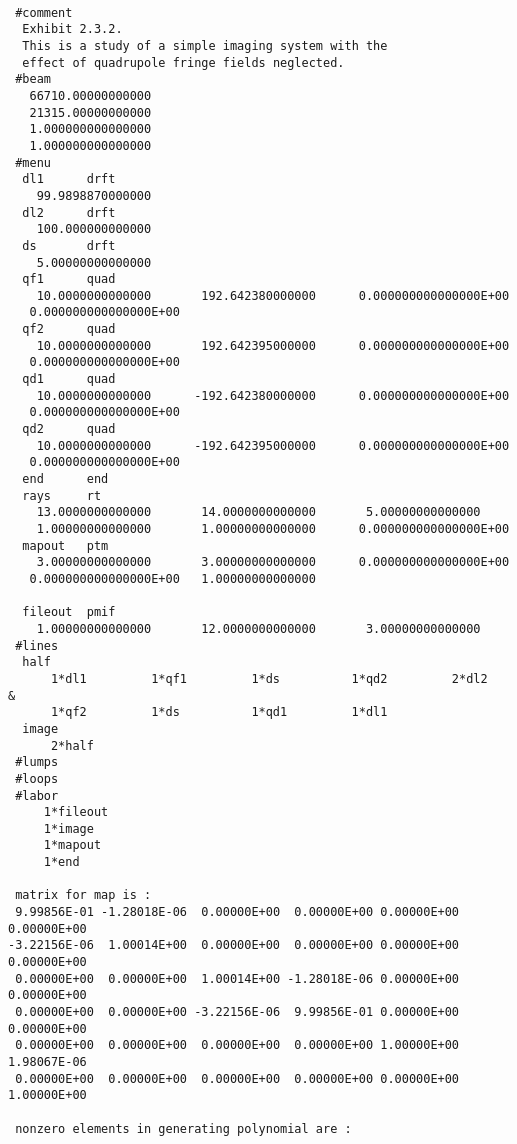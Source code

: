 {
\footnotesize\tt
\begin{verbatim}
 #comment
  Exhibit 2.3.2.
  This is a study of a simple imaging system with the
  effect of quadrupole fringe fields neglected.
 #beam
   66710.00000000000
   21315.00000000000
   1.000000000000000
   1.000000000000000
 #menu
  dl1      drft
    99.9898870000000
  dl2      drft
    100.000000000000
  ds       drft
    5.00000000000000
  qf1      quad
    10.0000000000000       192.642380000000      0.000000000000000E+00
   0.000000000000000E+00
  qf2      quad
    10.0000000000000       192.642395000000      0.000000000000000E+00
   0.000000000000000E+00
  qd1      quad
    10.0000000000000      -192.642380000000      0.000000000000000E+00
   0.000000000000000E+00
  qd2      quad
    10.0000000000000      -192.642395000000      0.000000000000000E+00
   0.000000000000000E+00
  end      end
  rays     rt
    13.0000000000000       14.0000000000000       5.00000000000000
    1.00000000000000       1.00000000000000      0.000000000000000E+00
  mapout   ptm
    3.00000000000000       3.00000000000000      0.000000000000000E+00
   0.000000000000000E+00   1.00000000000000

  fileout  pmif
    1.00000000000000       12.0000000000000       3.00000000000000
 #lines
  half
      1*dl1         1*qf1         1*ds          1*qd2         2*dl2
&
      1*qf2         1*ds          1*qd1         1*dl1
  image
      2*half
 #lumps
 #loops
 #labor
     1*fileout
     1*image
     1*mapout
     1*end

 matrix for map is :
 9.99856E-01 -1.28018E-06  0.00000E+00  0.00000E+00 0.00000E+00 0.00000E+00
-3.22156E-06  1.00014E+00  0.00000E+00  0.00000E+00 0.00000E+00 0.00000E+00
 0.00000E+00  0.00000E+00  1.00014E+00 -1.28018E-06 0.00000E+00 0.00000E+00
 0.00000E+00  0.00000E+00 -3.22156E-06  9.99856E-01 0.00000E+00 0.00000E+00
 0.00000E+00  0.00000E+00  0.00000E+00  0.00000E+00 1.00000E+00 1.98067E-06
 0.00000E+00  0.00000E+00  0.00000E+00  0.00000E+00 0.00000E+00 1.00000E+00

 nonzero elements in generating polynomial are :


\end{verbatim}}

